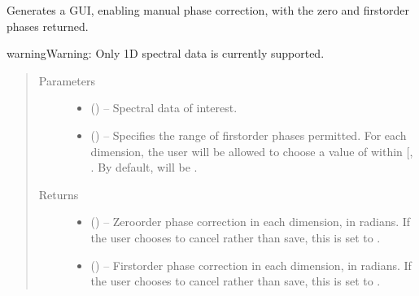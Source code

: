 \documentclass[letterpaper,10pt,english]{sphinxmanual}
\begin{document}
\begin{fulllineitems}
\label{\detokenize{references/sig:nmrespy.sig.manual_phase_spectrum}}
\sphinxAtStartPar
Generates a GUI, enabling manual phase correction, with the zero\sphinxhyphen{} and
first\sphinxhyphen{}order phases returned.

\begin{sphinxadmonition}{warning}{Warning:}
\sphinxAtStartPar
Only 1D spectral data is currently supported.
\end{sphinxadmonition}
\begin{quote}\begin{description}
\item[{Parameters}] \leavevmode\begin{itemize}
\item {} 
\sphinxAtStartPar
{} () – Spectral data of interest.

\item {} 
\sphinxAtStartPar
{} (\sphinxstyleliteralemphasis{\sphinxupquote{, }}) – Specifies the range of first\sphinxhyphen{}order phases permitted. For each
dimension, the user will be allowed to choose a value of 
within {[}, \sphinxtitleref{max\_p1}{]}. By default,  will be
.

\end{itemize}

\item[{Returns}] \leavevmode
\sphinxAtStartPar
\begin{itemize}
\item {} 
\sphinxAtStartPar
{} () – Zero\sphinxhyphen{}order phase correction in each dimension, in radians. If the
user chooses to cancel rather than save, this is set to .

\item {} 
\sphinxAtStartPar
{} () – First\sphinxhyphen{}order phase correction in each dimension, in radians. If the
user chooses to cancel rather than save, this is set to .

\end{itemize}


\end{description}\end{quote}

\end{fulllineitems}
\end{document}
